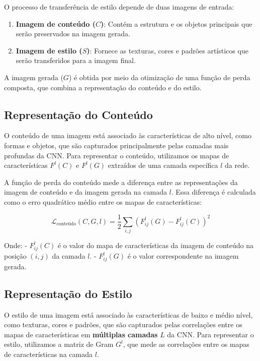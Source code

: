 \documentclass{tufte-handout}
\begin{document}
O processo de transferência de estilo depende de duas imagens de entrada:
\begin{enumerate}
    \item \textbf{Imagem de conteúdo ($C$)}: Contém a estrutura e os objetos principais que serão preservados na imagem gerada.
    \item \textbf{Imagem de estilo ($S$)}: Fornece as texturas, cores e padrões artísticos que serão transferidos para a imagem final.
\end{enumerate}


A imagem gerada ($G$) é obtida por meio da otimização de uma função de perda composta, que combina a representação do conteúdo e do estilo.

\subsection{Representação do Conteúdo}

O conteúdo de uma imagem está associado às características de alto nível, como formas e objetos, que são capturados principalmente pelas camadas mais profundas da CNN. Para representar o conteúdo, utilizamos os mapas de características $F^l(C)$ e $F^l(G)$ extraídos de uma camada específica $l$ da rede.

A função de perda do conteúdo mede a diferença entre as representações da imagem de conteúdo e da imagem gerada na camada $l$. Essa diferença é calculada como o erro quadrático médio entre os mapas de características:

\begin{equation}
    \mathcal{L}_{\text{conteúdo}} (C, G, l) = \frac{1}{2} \sum_{i,j} \left(F_{ij}^l(G) - F_{ij}^l(C)\right)^2
\end{equation}

Onde:
- $F_{ij}^l(C)$ é o valor do mapa de características da imagem de conteúdo na posição $(i,j)$ da camada $l$.
- $F_{ij}^l(G)$ é o valor correspondente na imagem gerada.

\subsection{Representação do Estilo}

O estilo de uma imagem está associado às características de baixo e médio nível, como texturas, cores e padrões, que são capturados pelas correlações entre os mapas de características em \textbf{múltiplas camadas} $L$ da CNN. Para representar o estilo, utilizamos a matriz de Gram $G^l$, que mede as correlações entre os mapas de características na camada $l$.
\end{document}
